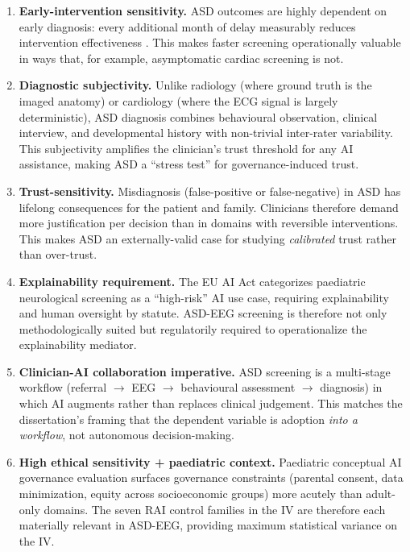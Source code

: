\begin{enumerate}[leftmargin=*, itemsep=3pt]
    \item \textbf{Early-intervention sensitivity.} ASD outcomes are highly dependent on early diagnosis: every additional month of delay measurably reduces intervention effectiveness \cite{zwaigenbaum2015earlyasd}. This makes faster screening operationally valuable in ways that, for example, asymptomatic cardiac screening is not.
    \item \textbf{Diagnostic subjectivity.} Unlike radiology (where ground truth is the imaged anatomy) or cardiology (where the ECG signal is largely deterministic), ASD diagnosis combines behavioural observation, clinical interview, and developmental history with non-trivial inter-rater variability. This subjectivity amplifies the clinician's trust threshold for any AI assistance, making ASD a ``stress test'' for governance-induced trust.
    \item \textbf{Trust-sensitivity.} Misdiagnosis (false-positive or false-negative) in ASD has lifelong consequences for the patient and family. Clinicians therefore demand more justification per decision than in domains with reversible interventions. This makes ASD an externally-valid case for studying \emph{calibrated} trust rather than over-trust.
    \item \textbf{Explainability requirement.} The EU AI Act categorizes paediatric neurological screening as a ``high-risk'' AI use case, requiring explainability and human oversight by statute. ASD-EEG screening is therefore not only methodologically suited but regulatorily required to operationalize the explainability mediator.
    \item \textbf{Clinician-AI collaboration imperative.} ASD screening is a multi-stage workflow (referral $\to$ EEG $\to$ behavioural assessment $\to$ diagnosis) in which AI augments rather than replaces clinical judgement. This matches the dissertation's framing that the dependent variable is adoption \emph{into a workflow}, not autonomous decision-making.
    \item \textbf{High ethical sensitivity + paediatric context.} Paediatric conceptual AI governance evaluation surfaces governance constraints (parental consent, data minimization, equity across socioeconomic groups) more acutely than adult-only domains. The seven RAI control families in the IV are therefore each materially relevant in ASD-EEG, providing maximum statistical variance on the IV.
\end{enumerate}

